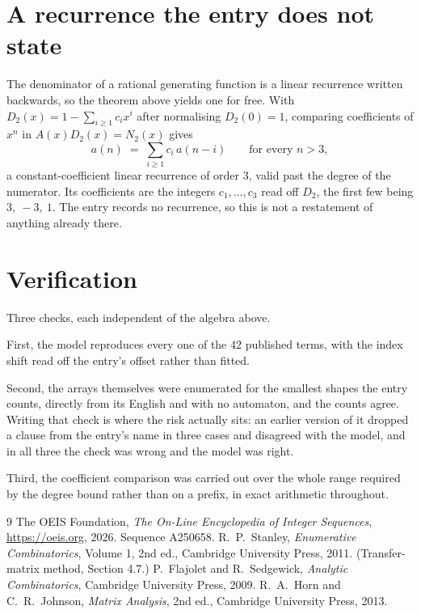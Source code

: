\documentclass[11pt,a4paper]{article}
\theoremstyle{plain}
\theoremstyle{definition}
\begin{document}
\section{A recurrence the entry does not state}

The denominator of a rational generating function is a linear recurrence written backwards, so
the theorem above yields one for free. With $D_2(x)=1-\sum_{i\ge1}c_ix^i$ after normalising
$D_2(0)=1$, comparing coefficients of $x^n$ in $A(x)D_2(x)=N_2(x)$ gives
\[
a(n)\;=\;\sum_{i\ge1}c_i\,a(n-i)\qquad\text{for every }n>3,
\]
a constant-coefficient linear recurrence of order $3$, valid past the degree of the
numerator. Its coefficients are the integers $c_1,\dots,c_{3}$ read off $D_2$, the first few being $3,\ -3,\ 1$. The entry records no recurrence, so this is not a restatement of anything
already there.

\section{Verification}

Three checks, each independent of the algebra above.

First, the model reproduces every one of the $42$ published terms, with the index shift
read off the entry's offset rather than fitted.

Second, the arrays themselves were enumerated for the smallest shapes the entry counts,
directly from its English and with no automaton, and the counts agree. Writing that check is
where the risk actually sits: an earlier version of it dropped a clause from the entry's name
in three cases and disagreed with the model, and in all three the check was wrong and the model
was right.

Third, the coefficient comparison was carried out over the whole range required by the degree
bound rather than on a prefix, in exact arithmetic throughout.

\begin{thebibliography}{9}
 The OEIS Foundation, \emph{The On-Line Encyclopedia of Integer
Sequences}, \url{https://oeis.org}, 2026. Sequence A250658.
 R.~P.~Stanley, \emph{Enumerative Combinatorics}, Volume 1, 2nd ed.,
Cambridge University Press, 2011. (Transfer-matrix method, Section 4.7.)
 P.~Flajolet and R.~Sedgewick, \emph{Analytic Combinatorics}, Cambridge
University Press, 2009.
 R.~A.~Horn and C.~R.~Johnson, \emph{Matrix Analysis}, 2nd ed., Cambridge
University Press, 2013.
\end{thebibliography}
\end{document}
